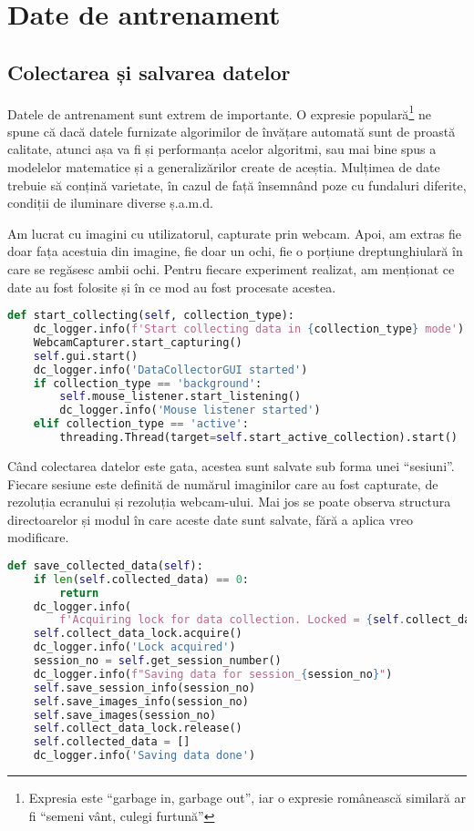 \chapter{Date de antrenament}
\label{chapter3}
\section{Colectarea și salvarea datelor}
Datele de antrenament sunt extrem de importante.
O expresie populară\footnote{Expresia este ``garbage in, garbage out'', iar o expresie românească similară ar fi ``semeni vânt, culegi furtună''} ne spune că dacă datele furnizate algorimilor de învățare automată sunt de proastă calitate, atunci așa va fi și performanța acelor algoritmi, sau mai bine spus a modelelor matematice și a generalizărilor create de aceștia.
Mulțimea de date trebuie să conțină varietate, în cazul de față însemnând poze cu fundaluri diferite, condiții de iluminare diverse ș.a.m.d.

Am lucrat cu imagini cu utilizatorul, capturate prin webcam.
Apoi, am extras fie doar fața acestuia din imagine, fie doar un ochi, fie o porțiune dreptunghiulară în care se regăsesc ambii ochi.
Pentru fiecare experiment realizat, am menționat ce date au fost folosite și în ce mod au fost procesate acestea.

\begin{lstlisting}[language=Python, caption=Colectarea datelor]
def start_collecting(self, collection_type):
    dc_logger.info(f'Start collecting data in {collection_type} mode')
    WebcamCapturer.start_capturing()
    self.gui.start()
    dc_logger.info('DataCollectorGUI started')
    if collection_type == 'background':
        self.mouse_listener.start_listening()
        dc_logger.info('Mouse listener started')
    elif collection_type == 'active':
        threading.Thread(target=self.start_active_collection).start()
\end{lstlisting}

Când colectarea datelor este gata, acestea sunt salvate sub forma unei ``sesiuni''.
Fiecare sesiune este definită de numărul imaginilor care au fost capturate, de rezoluția ecranului și rezoluția webcam-ului.
Mai jos se poate observa structura directoarelor și modul în care aceste date sunt salvate, fără a aplica vreo modificare.

\begin{lstlisting}[language=Python, caption=Salvarea datelor]
def save_collected_data(self):
    if len(self.collected_data) == 0:
        return
    dc_logger.info(
        f'Acquiring lock for data collection. Locked = {self.collect_data_lock.locked()}')
    self.collect_data_lock.acquire()
    dc_logger.info('Lock acquired')
    session_no = self.get_session_number()
    dc_logger.info(f"Saving data for session_{session_no}")
    self.save_session_info(session_no)
    self.save_images_info(session_no)
    self.save_images(session_no)
    self.collect_data_lock.release()
    self.collected_data = []
    dc_logger.info('Saving data done')
\end{lstlisting}


